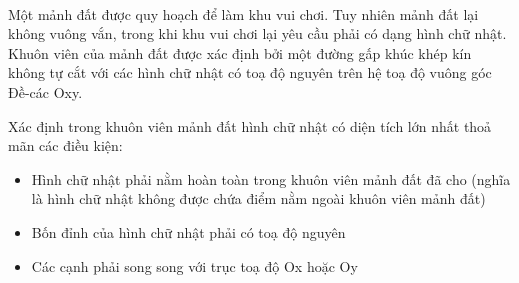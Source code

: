  

Một mảnh đất được quy hoạch để làm khu vui chơi. Tuy nhiên mảnh đất lại không vuông vắn, trong khi khu vui chơi lại yêu cầu phải có dạng hình chữ nhật. Khuôn viên của mảnh đất được xác định bởi một đường gấp khúc khép kín không tự cắt với các hình chữ nhật có toạ độ nguyên trên hệ toạ độ vuông góc Đề-các Oxy.

Xác định trong khuôn viên mảnh đất hình chữ nhật có diện tích lớn nhất thoả mãn các điều kiện:
\begin{itemize}
	\item Hình chữ nhật phải nằm hoàn toàn trong khuôn viên mảnh đất đã cho (nghĩa là hình chữ nhật không được chứa điểm nằm ngoài khuôn viên mảnh đất)
	\item Bốn đỉnh của hình chữ nhật phải có toạ độ nguyên
	\item Các cạnh phải song song với trục toạ độ Ox hoặc Oy
\end{itemize}
